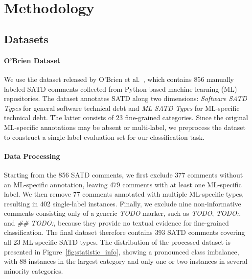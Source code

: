 \documentclass[acmsmall,screen,review,anonymous]{acmart}
\begin{document}




\section{Methodology}\label{sec:methodology}


\subsection{Datasets}

\paragraph{O'Brien Dataset}
We use the dataset released by O'Brien et al.~\cite{obrien202223}, which contains 856 manually labeled SATD comments collected from Python-based machine learning (ML) repositories. The dataset annotates SATD along two dimensions: \textit{Software SATD Types} for general software technical debt and \textit{ML SATD Types} for ML-specific technical debt. The latter consists of 23 fine-grained categories. Since the original ML-specific annotations may be absent or multi-label, we preprocess the dataset to construct a single-label evaluation set for our classification task.

\paragraph{Data Processing}
Starting from the 856 SATD comments, we first exclude 377 comments without an ML-specific annotation, leaving 479 comments with at least one ML-specific label. We then remove 77 comments annotated with multiple ML-specific types, resulting in 402 single-label instances. Finally, we exclude nine non-informative comments consisting only of a generic \textit{TODO} marker, such as \textit{TODO}, \textit{TODO:}, and \textit{\#\# TODO:}, because they provide no textual evidence for fine-grained classification. The final dataset therefore contains 393 SATD comments covering all 23 ML-specific SATD types. The distribution of the processed dataset is presented in Figure~\ref{fig:statistic_info}, showing a pronounced class imbalance, with 88 instances in the largest category and only one or two instances in several minority categories.
\end{document}
